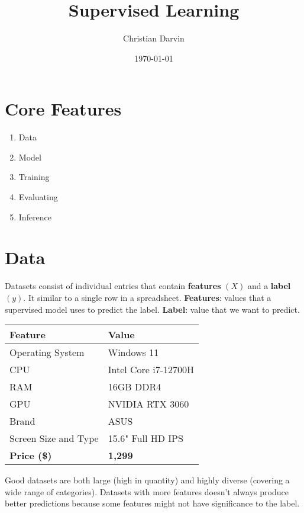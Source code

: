 \documentclass[a4paper,12pt]{article}
\title{Supervised Learning}
\author{Christian Darvin}
\date{\today}
\begin{document}
\maketitle
\section*{Core Features}
\begin{enumerate}
    \item Data
    \item Model
    \item Training
    \item Evaluating
    \item Inference
\end{enumerate}

\section*{Data}
Datasets consist of individual entries that contain \textbf{features} $(X)$ and a \textbf{label} $(y)$. It similar to a single row in a spreadsheet. \newline
\textbf{Features}: values that a supervised model uses to predict the label. \newline
\textbf{Label}: value that we want to predict. \newline

\begin{center}
\begin{tabularx}{\textwidth}{@{}lX@{}}
\toprule
\textbf{Feature} & \textbf{Value} \\
\midrule
Operating System & Windows 11 \\
CPU & Intel Core i7-12700H \\
RAM & 16GB DDR4 \\
GPU & NVIDIA RTX 3060 \\
Brand & ASUS \\
Screen Size and Type & 15.6" Full HD IPS \\
\textbf{Price (\$)} & \textbf{1,299} \\
\bottomrule
\end{tabularx}
\end{center}

\noindent Good datasets are both large (high in quantity) and highly diverse (covering a wide range of categories). Datasets with more features doesn't always produce better predictions because some features might not have significance to the label.
\end{document}
